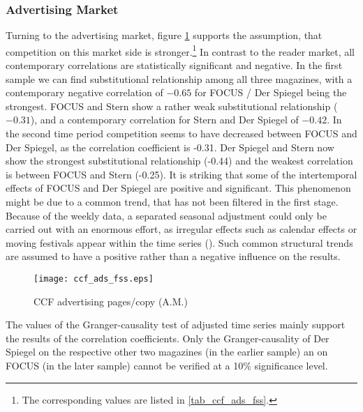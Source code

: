 \documentclass[12pt,a4paper]{scrreprt}
\begin{document}
\subsubsection{Advertising Market}
Turning to the advertising market, figure \ref{fig_ccf_ads_fss} supports the assumption, that competition on this market side is stronger.\footnote{The corresponding values are listed in \ref{tab_ccf_ads_fss}.} In contrast to the reader market, all contemporary correlations are statistically significant and negative. In the first sample we can find substitutional relationship among all three magazines, with a contemporary negative correlation of $-0.65$ for FOCUS / Der Spiegel being the strongest. FOCUS and Stern show a rather weak substitutional relationship ($-0.31$), and a contemporary correlation for Stern and Der Spiegel of $-0.42$. In the second time period competition seems to have decreased between FOCUS and Der Spiegel, as the correlation coefficient is -0.31. Der Spiegel and Stern now show the strongest substitutional relationship (-0.44) and the weakest correlation is between FOCUS and Stern (-0.25). It is striking that some of the intertemporal effects of FOCUS and Der Spiegel are positive and significant. This phenomenon might be due to a common trend, that has not been filtered in the first stage. Because of the weekly data, a separated seasonal adjustment could only be carried out with an enormous effort, as irregular effects such as calendar effects or moving festivals appear within the time series (\cite{harvey_modeling_1997}). Such common structural trends are assumed to have a positive rather than a negative influence on the results. 


\begin{figure}[H]
\caption{CCF advertising pages/copy (A.M.)}
	\centering
	\texttt{[image: ccf\_ads\_fss.eps]}
	\label{fig_ccf_ads_fss}
\end{figure}

The values of the Granger-causality test of adjusted time series mainly support the results of the correlation coefficients. Only the Granger-causality of Der Spiegel on the respective other two magazines (in the earlier sample) an on FOCUS (in the later sample) cannot be verified at a 10$\%$ significance level. 
\end{document}
